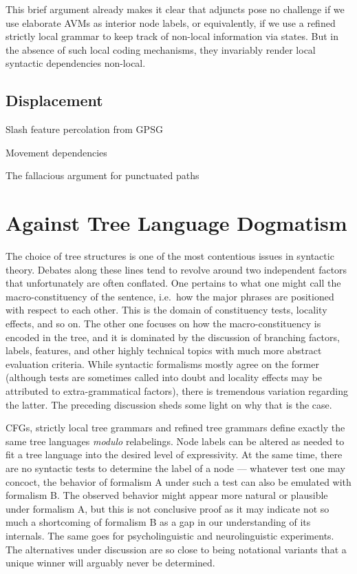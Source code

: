 This brief argument already makes it clear that adjuncts pose no challenge if we use elaborate AVMs as interior node labels, or equivalently, if we use a refined strictly local grammar to keep track of non-local information via states.
But in the absence of such local coding mechanisms, they invariably render local syntactic dependencies non-local.


\subsection{Displacement}

Slash feature percolation from GPSG \citep{Gazdar.etal85}

Movement dependencies

The fallacious argument for punctuated paths \citep{Abels03}


\section{Against Tree Language Dogmatism}

The choice of tree structures is one of the most contentious issues in syntactic theory.
Debates along these lines tend to revolve around two independent factors that unfortunately are often conflated.
One pertains to what one might call the macro-constituency of the sentence, i.e.\ how the major phrases are positioned with respect to each other.
This is the domain of constituency tests, locality effects, and so on.
The other one focuses on how the macro-constituency is encoded in the tree, and it is dominated by the discussion of branching factors, labels, features, and other highly technical topics with much more abstract evaluation criteria.
While syntactic formalisms mostly agree on the former (although tests are sometimes called into doubt and locality effects may be attributed to extra-grammatical factors), there is tremendous variation regarding the latter.
The preceding discussion sheds some light on why that is the case.

CFGs, strictly local tree grammars and refined tree grammars define exactly the same tree languages \emph{modulo} relabelings.
Node labels can be altered as needed to fit a tree language into the desired level of expressivity.
At the same time, there are no syntactic tests to determine the label of a node --- whatever test one may concoct, the behavior of formalism A under such a test can also be emulated with formalism B\@.
The observed behavior might appear more natural or plausible under formalism A, but this is not conclusive proof as it may indicate not so much a shortcoming of formalism B as a gap in our understanding of its internals\@.
The same goes for psycholinguistic and neurolinguistic experiments.
The alternatives under discussion are so close to being notational variants that a unique winner will arguably never be determined.

